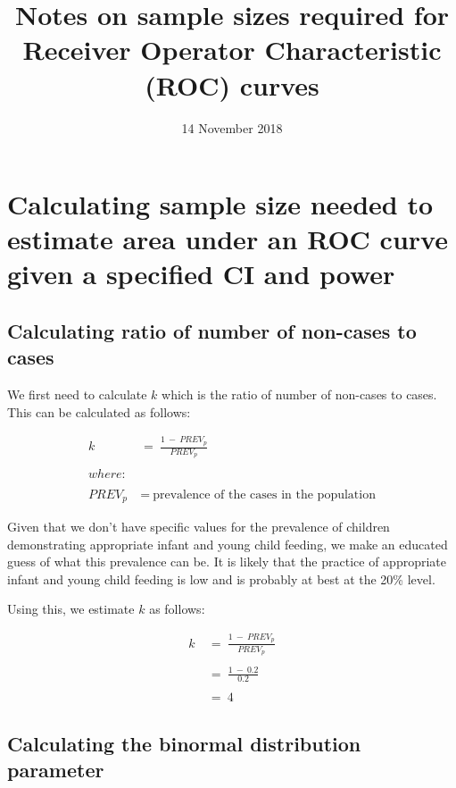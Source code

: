 \documentclass[12pt,a4paper]{article}
\title{Notes on sample sizes required for Receiver Operator Characteristic
(ROC) curves}
\author{}
\date{14 November 2018}
\theoremstyle{definition}
\theoremstyle{definition}
\theoremstyle{definition}
\theoremstyle{remark}
\begin{document}
\maketitle

\hypertarget{calculating-sample-size-needed-to-estimate-area-under-an-roc-curve-given-a-specified-ci-and-power}{%
\section{Calculating sample size needed to estimate area under an ROC
curve given a specified CI and
power}\label{calculating-sample-size-needed-to-estimate-area-under-an-roc-curve-given-a-specified-ci-and-power}}

\hypertarget{calculating-ratio-of-number-of-non-cases-to-cases}{%
\subsection{Calculating ratio of number of non-cases to
cases}\label{calculating-ratio-of-number-of-non-cases-to-cases}}

We first need to calculate \(k\) which is the ratio of number of
non-cases to cases. This can be calculated as follows:

\[ \begin{aligned}
k ~ & = ~ \frac{1 ~ - ~ PREV_p}{PREV_p} \\
\\
where: & \\
\\
PREV_p ~ & = ~ \text{prevalence of the cases in the population}
\end{aligned} \]

Given that we don't have specific values for the prevalence of children
demonstrating appropriate infant and young child feeding, we make an
educated guess of what this prevalence can be. It is likely that the
practice of appropriate infant and young child feeding is low and is
probably at best at the 20\% level.

Using this, we estimate \(k\) as follows:

\[ \begin{aligned} 
k ~ & = ~ \frac{1 ~ - ~ PREV_p}{PREV_p} \\
\\
& = ~ \frac{1 ~ - ~ 0.2}{0.2} \\
\\
& = ~ 4
\end{aligned} \]

\hypertarget{calculating-the-binormal-distribution-parameter}{%
\subsection{Calculating the binormal distribution
parameter}\label{calculating-the-binormal-distribution-parameter}}
\end{document}

